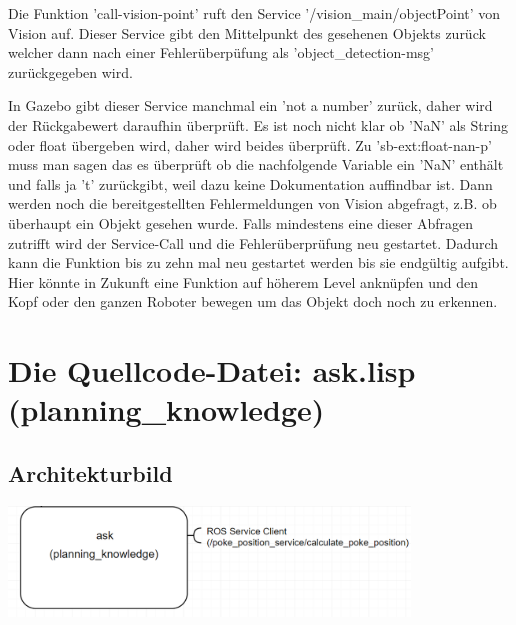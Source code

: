 \documentclass{suturo}
\begin{document}
Die Funktion 'call-vision-point' ruft den Service '/vision\_main/objectPoint' von Vision auf. Dieser Service gibt den Mittelpunkt des gesehenen Objekts zurück welcher dann nach einer Fehlerüberpüfung als 'object\_detection-msg' zurückgegeben wird. 

In Gazebo gibt dieser Service manchmal ein 'not a number' zurück, daher wird der Rückgabewert daraufhin überprüft. Es ist noch nicht klar ob 'NaN' als String oder float übergeben wird, daher wird beides überprüft. Zu 'sb-ext:float-nan-p' muss man sagen das es überprüft ob die nachfolgende Variable ein 'NaN' enthält und falls ja 't' zurückgibt, weil dazu keine Dokumentation auffindbar ist. Dann werden noch die bereitgestellten Fehlermeldungen von Vision abgefragt, z.B. ob überhaupt ein Objekt gesehen wurde. Falls mindestens eine dieser Abfragen zutrifft wird der Service-Call und die Fehlerüberprüfung neu gestartet. Dadurch kann die Funktion bis zu zehn mal neu gestartet werden bis sie endgültig aufgibt. Hier könnte in Zukunft eine Funktion auf höherem Level anknüpfen und den Kopf oder den ganzen Roboter bewegen um das Objekt doch noch zu erkennen.




\section{Die Quellcode-Datei: ask.lisp (planning\_knowledge)}
\subsection{Architekturbild}

\begin{center} \includegraphics[width=0.8\textwidth]{img/diag_planning_knowledge.png} \end{center}



\begin{figure}[!htb]
\end{figure}
\end{document}
